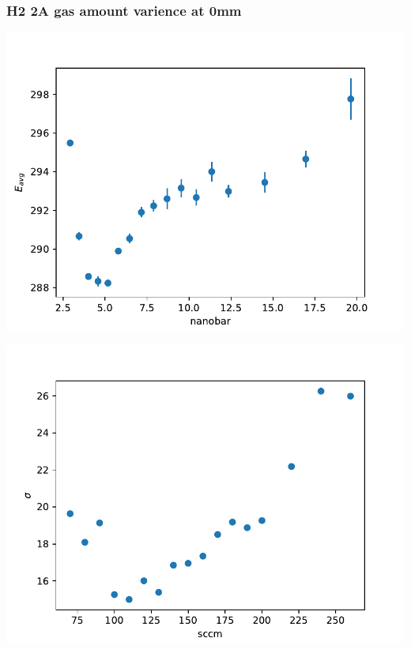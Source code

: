 \documentclass{beamer} %
\begin{document}
\begin{frame}
    \frametitle{H2 2A gas amount varience at 0mm}
    \begin{minipage}{0.49\textwidth}
        \includegraphics[width=1.1\textwidth]{figures/Gasvary_H2_2A_Energy_werrors.pdf}
    \end{minipage}
    \begin{minipage}{0.49\textwidth}
        \includegraphics[width=1.1\textwidth]{figures/Gasvary_H2_2A_Energy_sigma.pdf}
    \end{minipage}
    \begin{minipage}{0.49\textwidth}

\end{minipage}
\end{frame}
\end{document}
